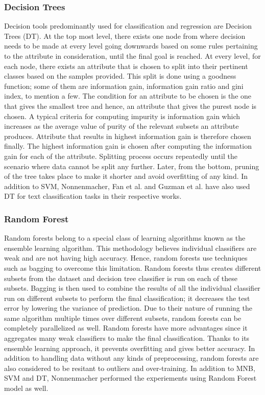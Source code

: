 \documentclass[a4paper,12pt,twoside]{report}
\begin{document}
\subsubsection{Decision Trees}
Decision tools predominantly used for classification and regression are Decision Trees (DT). At the top most level, there exists one node from where decision needs to be made at every level going downwards based on some rules pertaining to the attribute in consideration, until the final goal is reached\cite{Jain2017}. 
\bigbreak
At every level, for each node, there exists an attribute that is chosen to split into their pertinent classes based on the samples provided. This split is done using a goodness function; some of them are information gain, information gain ratio and gini index, to mention a few. The condition for an attribute to be chosen is the one that gives the smallest tree and hence, an attribute that gives the purest node is chosen. A typical criteria for computing impurity is information gain which increases as the average value of purity of the relevant subsets an attribute produces. Attribute that results in highest information gain is therefore chosen finally\cite{Jain2017}. 
\bigbreak
The highest information gain is chosen after computing the information gain for each of the attribute. Splitting process occurs repeatedly until the scenario where data cannot be split any further. Later, from the bottom, pruning of the tree takes place to make it shorter and avoid overfitting of any kind. In addition to SVM, Nonnenmacher\cite{Nonnenmacher2017}, Fan et al.\cite{Fan2017} and Guzman et al.\cite{Guzman2016} have also used DT for text classification tasks in their respective works.

\subsubsection{Random Forest}
Random forests belong to a special class of learning algorithms known as the ensemble learning algorithm. This methodology believes individual classifiers are weak and are not having high accuracy. Hence, random forests use techniques such as bagging to overcome this limitation. Random forests thus creates different subsets from the dataset and decision tree classifier is run on each of these subsets. Bagging is then used to combine the results of all the individual classifier run on different subsets to perform the final classification; it decreases the test error by lowering the variance of prediction\cite{Jain2017}. 
\bigbreak
Due to their nature of running the same algorithm multiple times over different subsets, random forests can be completely parallelized as well. Random forests have more advantages since it aggregates many weak classifiers to make the final classification. Thanks to its ensemble learning approach, it prevents overfitting and gives better accuracy. In addition to handling data without any kinds of preprocessing, random forests are also considered to be resitant to outliers and over-training\cite{Jain2017}. In addition to MNB, SVM and DT, Nonnenmacher\cite{Nonnenmacher2017} performed the experiements using Random Forest model as well. 
\end{document}
